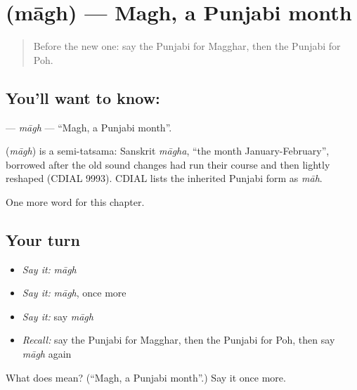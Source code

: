 \section[\texorpdfstring{\pa{ਮਾਘ} (māgh)}{ਮਾਘ (māgh)}]{ (māgh) — Magh, a Punjabi month}

\label{lesson:PA-C105-magh}



\begin{quote}
Before the new one: say the Punjabi for Magghar, then the Punjabi for Poh.
\end{quote}

\subsection*{You'll want to know: }
\textbf{} — \emph{māgh} — \textquotedblleft{}Magh, a Punjabi month\textquotedblright{}.

\begin{cousinweb}
\textbf{} (\emph{māgh}) is a semi-tatsama: Sanskrit \emph{māgha}, \textquotedblleft{}the month January-February\textquotedblright{}, borrowed after the old sound changes had run their course and then lightly reshaped (CDIAL 9993). CDIAL lists the inherited Punjabi form as \emph{māh}.
\end{cousinweb}

\begin{grammarlens}[title={What you've built}]
One more word for this chapter.
\end{grammarlens}

\subsection*{Your turn}
\begin{itemize}
\raggedright
  \item \emph{Say it:} \emph{māgh}
  \item \emph{Say it:} \emph{māgh}, once more
  \item \emph{Say it:} say \emph{māgh}
  \item \emph{Recall:} say the Punjabi for Magghar, then the Punjabi for Poh, then say \emph{māgh} again
\end{itemize}

\begin{tcolorbox}[breakable,colback=teal!4,colframe=teal!35!black,title={Before you move on}]
What does  mean? (\textquotedblleft{}Magh, a Punjabi month\textquotedblright{}.) Say it once more.
\end{tcolorbox}

